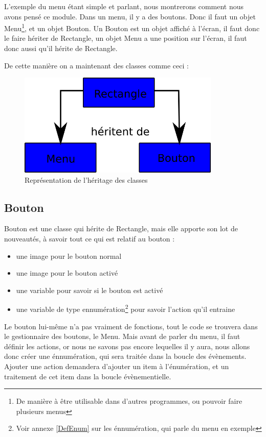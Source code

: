 
L'exemple du menu étant simple et parlant, nous montrerons comment nous avons pensé 
ce module. Dans un menu, il y a des boutons. Donc il faut un objet Menu\footnote{De manière à être 
utilisable dans d'autres programmes, ou pouvoir faire plusieurs menus}, et un objet Bouton. Un Bouton est un objet affiché à l'écran, il faut donc le faire hériter de Rectangle, un objet Menu a une position sur l'écran, il faut donc aussi qu'il hérite de Rectangle.

De cette manière on a maintenant des classes comme ceci :
\begin{figure}[H]
	\centering
	\includegraphics[width=26em]{Images/heritage_menu.png}
	\caption{Représentation de l'héritage des classes}
\end{figure} 
  
\subsection{Bouton}
	Bouton est une classe qui hérite de Rectangle, mais elle apporte son lot de nouveautés, à savoir tout ce qui est relatif au bouton : 
	\begin{itemize}
		\item une image pour le bouton normal
		\item une image pour le bouton activé
		\item une variable pour savoir si le bouton est activé
		\item une variable de type ennumération\footnote{Voir annexe \ref{DefEnum} sur les énnumération, qui parle du menu en exemple} pour savoir l'action qu'il entraine
	\end{itemize}
	
	Le bouton lui-même n'a pas vraiment de fonctions, tout le code se trouvera dans le gestionnaire des boutons, le Menu. Mais avant de parler du menu, il faut définir les actions, or nous ne savons pas encore lequelles il y aura, nous allons donc créer une énnumération, qui sera traitée dans la boucle des évènements. Ajouter une action demandera d'ajouter un item à l'énumération, et un traitement de cet item dans la boucle évènementielle.
	
